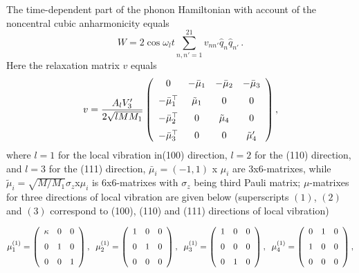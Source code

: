 The time-dependent part of the phonon Hamiltonian with account
of the noncentral cubic anharmonicity equals
\begin{equation}
W = 2\cos{\omega_{l} t}
\sum_{n,n'=1}^{21}v_{nn'}\hat{q}_{n}\hat{q}_{n'}\,.
\end{equation}
Here the relaxation matrix $v$ equals
\[ v =  \frac{A_lV'_3}{2\sqrt{lMM_1}}
\left (\begin{array}{cccc}
0&-\bar{\mu}_1&-\bar{\mu}_2&-\bar{\mu}_3\\\noalign{\medskip}
-\bar{\mu}_1^{\top}&\tilde{\mu}_1&0&0\\\noalign{\medskip}
-\bar{\mu}_2^{\top}&0&\tilde{\mu}_4&0\\\noalign{\medskip}
-\bar{\mu}_3^{\top}&0&0&\tilde{\mu}'_4\end{array}
\right ) , \]
where $l = 1$ for the local vibration in(100) direction, $l = 2$ for the (110)
direction, and $l = 3$ for the (111) direction,
$\bar{\mu}_i =(-1,1)$ x $\mu_i$ are 3x6-matrixes,
while $\tilde{\mu}_i = \sqrt{M/M_1}\sigma_z  $x$  \mu_i$ is 
6x6-matrixes with $\sigma_z$
being third Pauli matrix;  $\mu$-matrixes for three directions of local
vibration are given below (superscripts $(1)$, $(2)$ and $(3)$ correspond to
(100), (110) and (111) directions of local vibration)

\[ \mu_1^{(1)} = \left (\begin{array}{ccc}
\kappa&0&0\\\noalign{\medskip}0&1&0\\\noalign{
\medskip}0&0&1\end{array}
\right ) ,\;\;
\mu_2^{(1)} = \left (\begin{array}{ccc}
1&0&0\\\noalign{\medskip}0&1&0\\\noalign{\medskip}0
&0&0\end{array}\right ), \;\;
\mu_3^{(1)} = \left (\begin{array}{ccc}
1&0&0\\\noalign{\medskip}0&0&0\\\noalign{\medskip}0
&1&0\end {array}\right ),\;\;
\mu_4^{(1)} = \left (\begin{array}{ccc}
0&1&0\\\noalign{\medskip}1&0&0\\\noalign{\medskip}0
&0&0\end{array}\right ) ,\]

